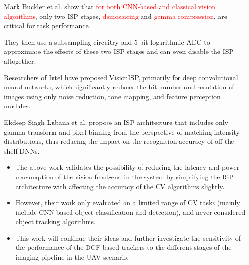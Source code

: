 \documentclass{beamer}
\begin{document}
\begin{frame}
    
    Mark Buckler et al. show that \textcolor{red}{for both CNN-based and classical vision algorithms}, only two ISP stages, \textcolor{red}{demosaicing} and \textcolor{red}{gamma compression}, are critical for task performance.
    
    \vspace{0.3in}
    
    They then use a subsampling circuitry and 5-bit logarithmic ADC to approximate the effects of these two ISP stages and can even disable the ISP altogether.

\end{frame}

\begin{frame}
    
    Researchers of Intel have proposed VisionISP, primarily for deep convolutional neural networks, which significantly reduces the bit-number and resolution of images using only noise reduction, tone mapping, and feature perception modules.
    
    \vspace{0.3in}
    
    Ekdeep Singh Lubana et al. propose an ISP architecture that includes only gamma transform and pixel binning from the perspective of matching intensity distributions, thus reducing the impact on the recognition accuracy of off-the-shelf DNNs.

\end{frame}

\begin{frame}
    \begin{itemize}[<+-| alert@+>]
        \item The above work validates the possibility of reducing the latency and power consumption of the vision front-end in the system by simplifying the ISP architecture with affecting the accuracy of the CV algorithms slightly.
        \item However, their work only evaluated on a limited range of CV tasks (mainly include CNN-based object classification and detection), and never considered object tracking algorithms.
        \item This work will continue their ideas and further investigate the sensitivity of the performance of the DCF-based trackers to the different stages of the imaging pipeline in the UAV scenario.
    \end{itemize}
\end{frame}
\end{document}
